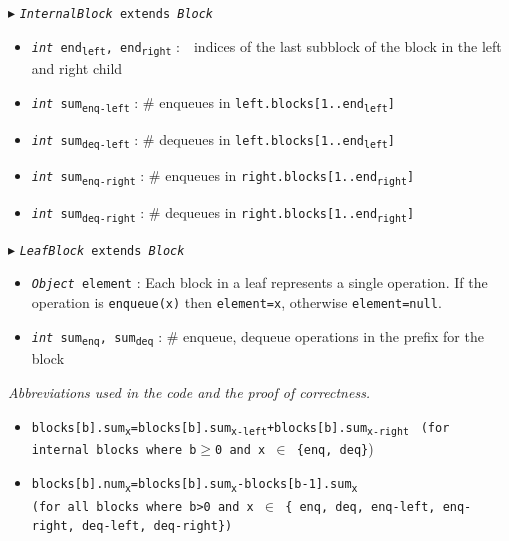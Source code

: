 \documentclass[10pt]{article}
\newcommand{\sub}[1]{\textsubscript{#1}}
\renewcommand{\tt}[1]{\texttt{#1}}
\renewcommand{\sl}[1]{\textsl{#1}}
\renewcommand{\it}[1]{\textit{#1}}
\theoremstyle{definition}
\begin{document}
\begin{algorithm}
\begin{algorithmic}[1]
\begin{multicols}{2}
\Statex $\blacktriangleright$ \tt{\sl{InternalBlock} extends \sl{Block}}
\begin{itemize}
    \item \tt{\sl{int} end\sub{left}, end\sub{right}}
  \textsf{:~~indices of the last subblock of the block in the left and right child}
  \item \tt{\sl{int} sum\sub{enq-left}}
  \textsf{: \# enqueues in \tt{left.blocks[1..end\sub{left}]}}
  \item \tt{\sl{int} sum\sub{deq-left}}
  \textsf{: \# dequeues in \tt{left.blocks[1..end\sub{left}]}}
  \item \tt{\sl{int} sum\sub{enq-right}}
  \textsf{: \# enqueues in \tt{right.blocks[1..end\sub{right}]}}
  \item \tt{\sl{int} sum\sub{deq-right}}
  \textsf{: \# dequeues in \tt{right.blocks[1..end\sub{right}]}}
\end{itemize}

\Statex $\blacktriangleright$ \tt{\sl{LeafBlock} extends \sl{Block}}
\begin{itemize}
  \item \tt{\sl{Object} element}
  \textsf{: Each block in a leaf represents a single operation. If the operation is \tt{enqueue(x)} then \tt{element=x}, otherwise \tt{element=null}.}
  
    \item \tt{\sl{int} sum\sub{enq}, sum\sub{deq}}
  \textsf{: \# enqueue, dequeue operations in the prefix for the block}
\end{itemize}

\end{multicols}
\end{algorithmic}
\end{algorithm}

\begin{footnotesize}

\it{Abbreviations used in the code and the proof of correctness.}
\begin{itemize}
 \item \tt{blocks[b].sum\sub{x}=blocks[b].sum\sub{x-left}+blocks[b].sum\sub{x-right}}  \tt{ (for internal blocks where b$\geq$0 and x $\in$ \{enq, deq\}})
  \item \tt{blocks[b].num\sub{x}=blocks[b].sum\sub{x}-blocks[b-1].sum\sub{x}} \\ \tt{(for all blocks where b>0 and x $\in$ \{ enq, deq, enq-left, enq-right, deq-left, deq-right\})}
\end{itemize}
\end{footnotesize}
\end{document}

